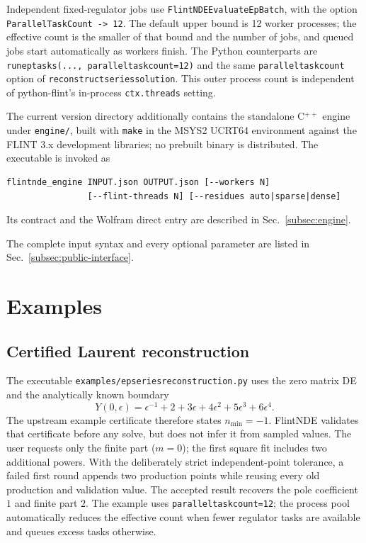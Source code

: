 \documentclass[11pt]{article}
\renewcommand{\_}{\origunderscore\allowbreak}
\begin{document}
Independent fixed-regulator jobs use
\texttt{FlintNDE}\allowbreak\texttt{EvaluateEpBatch}, with the option
\texttt{Parallel}\allowbreak\texttt{TaskCount -> 12}.  The default upper bound is 12 worker processes; the
effective count is the smaller of that bound and the number of jobs, and queued jobs start
automatically as workers finish.  The Python counterparts are
\texttt{run\_ep\_tasks(..., parallel\_task\_count=12)} and the same
\texttt{parallel\_task\_count} option of \texttt{reconstruct\_series\_solution}.  This outer
process count is independent of python-flint's in-process \texttt{ctx.threads} setting.

The current version directory additionally contains the standalone C$^{++}$ engine under
\texttt{engine/}, built with \texttt{make} in the MSYS2 UCRT64 environment against the FLINT
3.x development libraries; no prebuilt binary is distributed.  The executable is invoked as
\begin{verbatim}
flintnde_engine INPUT.json OUTPUT.json [--workers N]
                [--flint-threads N] [--residues auto|sparse|dense]
\end{verbatim}
Its contract and the Wolfram direct entry are described in
Sec.~\ref{subsec:engine}.

The complete input syntax and every optional parameter are listed in
Sec.~\ref{subsec:public-interface}.

\section{Examples}
\label{sec:examples}

\subsection{Certified Laurent reconstruction}

The executable \texttt{examples/ep\_series\_reconstruction.py} uses the zero matrix DE and
the analytically known boundary
\begin{equation}
 Y(0,\epsilon)=\epsilon^{-1}+2+3\epsilon+4\epsilon^2+5\epsilon^3+6\epsilon^4.
\end{equation}
The upstream example certificate therefore states $n_{\min}=-1$.  FlintNDE validates that
certificate before any solve, but does not infer it from sampled values.  The user requests only
the finite part ($m=0$); the first square fit includes two additional powers.  With the deliberately
strict independent-point tolerance, a failed first round appends two production points while
reusing every old production and validation value.  The accepted result recovers the pole
coefficient $1$ and finite part $2$.  The example uses
\texttt{parallel\_task\_count=12}; the process pool automatically reduces the effective count
when fewer regulator tasks are available and queues excess tasks otherwise.
\end{document}
